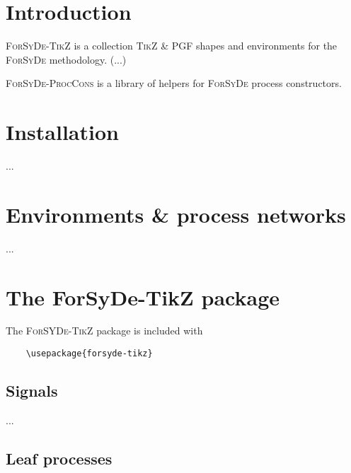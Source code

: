 \documentclass[10pt]{article}
\begin{document}
\maketitle

\begin{abstract}
This document is the reference manual for the \textsc{ForSyDe-TikZ} and \textsc{ForSyDe-ProcCons} packages. A new feature in the library should be reflected and documented in this manual.
\end{abstract}

\section{Introduction}

\textsc{ForSyDe-TikZ} is a collection \textsc{TikZ} \& \textsc{PGF} shapes and environments for the \textsc{ForSyDe} methodology. (...)

\textsc{ForSyDe-ProcCons} is a library of helpers for \textsc{ForSyDe} process constructors.

\section{Installation}

...

\section{Environments \& process networks}

...

\section{The ForSyDe-TikZ package}

The \textsc{ForSYDe-TikZ} package is included with

\begin{verbatim}
	\usepackage{forsyde-tikz}
\end{verbatim}

\subsection{Signals}

...

\subsection{Leaf processes}
\end{document}

